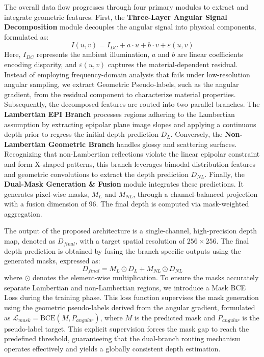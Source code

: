 \documentclass[lettersize,journal]{IEEEtran}
\begin{document}
The overall data flow progresses through four primary modules to extract and integrate geometric features. First, the \textbf{Three-Layer Angular Signal Decomposition} module decouples the angular signal into physical components, formulated as:
\begin{equation}
I(u,v) = I_{DC} + a \cdot u + b \cdot v + \varepsilon(u,v)
\label{eq:ch3_1}
\end{equation}
Here, $I_{DC}$ represents the ambient illumination, $a$ and $b$ are linear coefficients encoding disparity, and $\varepsilon(u,v)$ captures the material-dependent residual. Instead of employing frequency-domain analysis that fails under low-resolution angular sampling, we extract Geometric Pseudo-labels, such as the angular gradient, from the residual component to characterize material properties. Subsequently, the decomposed features are routed into two parallel branches. The \textbf{Lambertian EPI Branch} processes regions adhering to the Lambertian assumption by extracting epipolar plane image slopes and applying a continuous depth prior to regress the initial depth prediction $D_L$. Conversely, the \textbf{Non-Lambertian Geometric Branch} handles glossy and scattering surfaces. Recognizing that non-Lambertian reflections violate the linear epipolar constraint and form X-shaped patterns, this branch leverages bimodal distribution features and geometric convolutions to extract the depth prediction $D_{NL}$. Finally, the \textbf{Dual-Mask Generation \& Fusion} module integrates these predictions. It generates pixel-wise masks, $M_L$ and $M_{NL}$, through a channel-balanced projection with a fusion dimension of 96. The final depth is computed via mask-weighted aggregation.

The output of the proposed architecture is a single-channel, high-precision depth map, denoted as $D_{final}$, with a target spatial resolution of $256 \times 256$. The final depth prediction is obtained by fusing the branch-specific outputs using the generated masks, expressed as:
\begin{equation}
D_{final} = M_L \odot D_L + M_{NL} \odot D_{NL}
\label{eq:ch3_2}
\end{equation}
where $\odot$ denotes the element-wise multiplication. To ensure the masks accurately separate Lambertian and non-Lambertian regions, we introduce a Mask BCE Loss during the training phase. This loss function supervises the mask generation using the geometric pseudo-labels derived from the angular gradient, formulated as $\mathcal{L}_{mask} = \text{BCE}(M, P_{angular})$, where $M$ is the predicted mask and $P_{angular}$ is the pseudo-label target. This explicit supervision forces the mask gap to reach the predefined threshold, guaranteeing that the dual-branch routing mechanism operates effectively and yields a globally consistent depth estimation.
\end{document}
